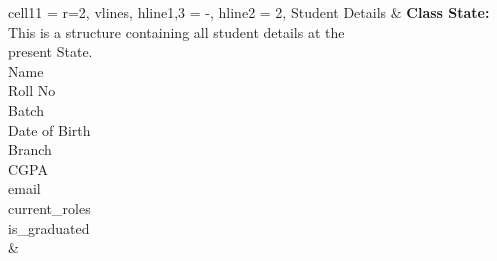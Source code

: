 \documentclass[11pt]{article}
\begin{document}
\begin{longtblr}[
  label = none,
  entry = none,
]{
  cell{1}{1} = {r=2}{},
  vlines,
  hline{1,3} = {-}{},
  hline{2} = {2}{},
}
Student Details & {\textbf{Class State: }This is a structure containing all student details at the\\ present State.\\
\hspace{\dimexpr\labelsep+0.5\tabcolsep}Name\\
\hspace{\dimexpr\labelsep+0.5\tabcolsep}Roll No\\
\hspace{\dimexpr\labelsep+0.5\tabcolsep}Batch\\
\hspace{\dimexpr\labelsep+0.5\tabcolsep}Date of Birth\\
\hspace{\dimexpr\labelsep+0.5\tabcolsep}Branch\\
\hspace{\dimexpr\labelsep+0.5\tabcolsep}CGPA\\
\hspace{\dimexpr\labelsep+0.5\tabcolsep}email\\
\hspace{\dimexpr\labelsep+0.5\tabcolsep}current\_roles\\
\hspace{\dimexpr\labelsep+0.5\tabcolsep}is\_graduated} \\
                &
\end{longtblr}
\end{document}
